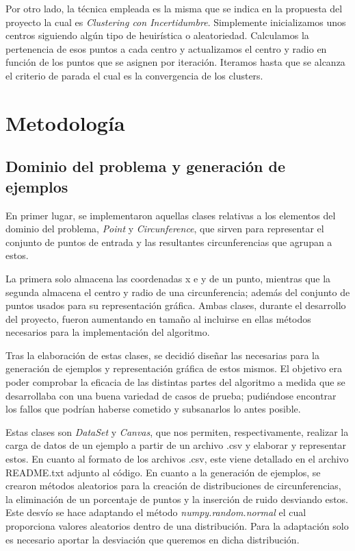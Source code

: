 \documentclass[conference,a4paper]{IEEEtran}
\begin{document}
Por otro lado, la técnica empleada es la misma que se indica en la propuesta del proyecto la cual es \textit{Clustering con Incertidumbre}. Simplemente inicializamos unos centros siguiendo algún tipo de heuirística o aleatoriedad. Calculamos la pertenencia de esos puntos a cada centro y actualizamos el centro y radio en función de los puntos que se asignen por iteración. Iteramos hasta que se alcanza el criterio de parada el cual es la convergencia de los clusters.

\section{Metodología}

\subsection{Dominio del problema y generación de ejemplos}

En primer lugar, se implementaron aquellas clases relativas a los elementos del dominio del problema, \textit{Point} y \textit{Circunference}, que sirven para representar el conjunto de puntos de entrada y las resultantes circunferencias que agrupan a estos.

La primera solo almacena las coordenadas x e y de un punto, mientras que la segunda almacena el centro y radio de una circunferencia; además del conjunto de puntos usados para su representación gráfica. Ambas clases, durante el desarrollo del proyecto, fueron aumentando en tamaño al incluirse en ellas métodos necesarios para la implementación del algoritmo.

Tras la elaboración de estas clases, se decidió diseñar las necesarias para la generación de ejemplos y representación gráfica de estos mismos. El objetivo era poder comprobar la eficacia de las distintas partes del algoritmo a medida que se desarrollaba con una buena variedad de casos de prueba; pudiéndose encontrar los fallos que podrían haberse cometido y subsanarlos lo antes posible.

Estas clases son \textit{DataSet} y  \textit{Canvas}, que nos permiten, respectivamente, realizar la carga de datos de un ejemplo a partir de un archivo .csv y elaborar y representar estos. En cuanto al formato de los archivos .csv, este viene detallado en el archivo README.txt adjunto al código. En cuanto a la generación de ejemplos, se crearon métodos aleatorios para la creación de distribuciones de circunferencias, la eliminación de un porcentaje de puntos y la inserción de ruido desviando estos. Este desvío se hace adaptando el método \textit{numpy.random.normal} el cual proporciona valores aleatorios dentro de una distribución. Para la adaptación solo es necesario aportar la desviación que queremos en dicha distribución.
\end{document}
